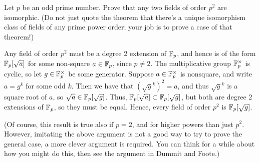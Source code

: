 %
\begin{question}[subtitle = August 2023 Problem 2,ID=Aug23_2]
Let $p$ be an odd prime number. Prove that any two fields of order $p^2$ are isomorphic. (Do not just quote the theorem that there's a unique isomorphism class of fields of any prime power order; your job is to prove a case of that theorem!)

\end{question}
\begin{solution}
Any field of order $p^2$ must be a degree 2 extension of $\mathbb{F}_p$, and hence is of the form $\mathbb{F}_p[\sqrt{a}]$ for some non-square $a \in \mathbb{F}_p$, since $p \neq 2$. The multiplicative group $\mathbb{F}_p^{\times}$ is cyclic, so let $g \in \mathbb{F}_p^{\times}$ be some generator. Suppose $a \in \mathbb{F}_p^{\times}$ is nonsquare, and write $a = g^k$ for some odd $k$. Then we have that $(\sqrt{g}^k)^2 = a$, and thus $\sqrt{g}^k$ is a square root of $a$, so $\sqrt{a} \in \mathbb{F}_p[\sqrt{g}]$. Thus, $\mathbb{F}_p[\sqrt{a}] \subset \mathbb{F}_p[\sqrt{g}]$, but both are degree 2 extensions of $\mathbb{F}_p$, so they must be equal. Hence, every field of order $p^2$ is $\mathbb{F}_p[\sqrt{g}]$.

(Of course, this result is true also if $p=2$, and for higher powers than just $p^2$. However, imitating the above argument is not a good way to try to prove the general case, a more clever argument is required. You can think for a while about how you might do this, then see the argument in Dummit and Foote.)
\end{solution}

